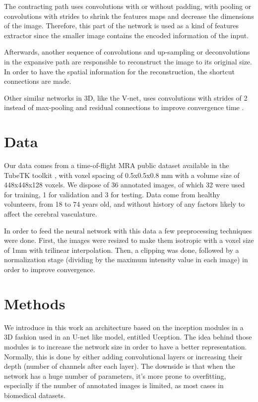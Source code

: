 \documentclass{article}
\begin{document}
The contracting path uses convolutions with or without padding, with pooling or convolutions with strides to shrink the features maps and decrease the dimensions of the image. Therefore, this part of the network is used as a kind of features extractor since the smaller image contains the encoded information of the input.

Afterwards, another sequence of convolutions and up-sampling or deconvolutions in the expansive path are responsible to reconstruct the image to its original size. In order to have the spatial information for the reconstruction, the shortcut connections are made.

Other similar networks in 3D, like the V-net, uses convolutions with strides of 2 instead of max-pooling and residual connections to improve convergence time \cite{Milletari2016}.




\section{Data}

Our data comes from a time-of-flight MRA public dataset available in the TubeTK toolkit \cite{Bullit}, with voxel spacing of 0.5x0.5x0.8 mm with a volume size of 448x448x128 voxels. We dispose of 36 annotated images, of which 32 were used for training, 1 for validation and 3 for testing. Data come from healthy volunteers, from 18 to 74 years old, and without history of any factors likely to affect the cerebral vasculature.

In order to feed the neural network with this data a few preprocessing techniques were done. First, the images were resized to make them isotropic with a voxel size of 1mm with trilinear interpolation. Then, a clipping was done, followed by a normalization stage (dividing by the maximum intensity value in each image) in order to improve convergence.

\section{Methods}


We introduce in this work an architecture based on the inception modules \cite{Szegedy2015} in a 3D fashion used in an U-net like model, entitled Uception. The idea behind those modules is to increase the network size in order to have a better representation. Normally, this is done by either adding convolutional layers or increasing their depth (number of channels after each layer). The downside is that when the network has a huge number of parameters, it's more prone to overfitting, especially if the number of annotated images is limited, as most cases in biomedical datasets.
\end{document}
